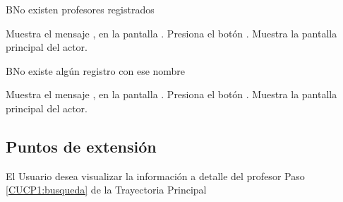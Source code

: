 \begin{UCtrayectoriaA}{B}{No existen profesores registrados}
	
	\UCpaso[\UCsist] Muestra el mensaje , en la pantalla .
	\UCpaso[\UCactor] Presiona el botón .
	\UCpaso[\UCsist] Muestra la pantalla principal del actor.
	
\end{UCtrayectoriaA}
\begin{UCtrayectoriaA}{B}{No existe algún registro con ese nombre}
	
	\UCpaso[\UCsist] Muestra el mensaje , en la pantalla  .
	\UCpaso[\UCactor] Presiona el botón .
	\UCpaso[\UCsist] Muestra la pantalla principal del actor.

\end{UCtrayectoriaA}

\subsection{Puntos de extensión}

\UCExtensionPoint
{El Usuario desea visualizar la información a detalle del profesor}
{ Paso \ref{CUCP1:busqueda} de la Trayectoria Principal}
{}



